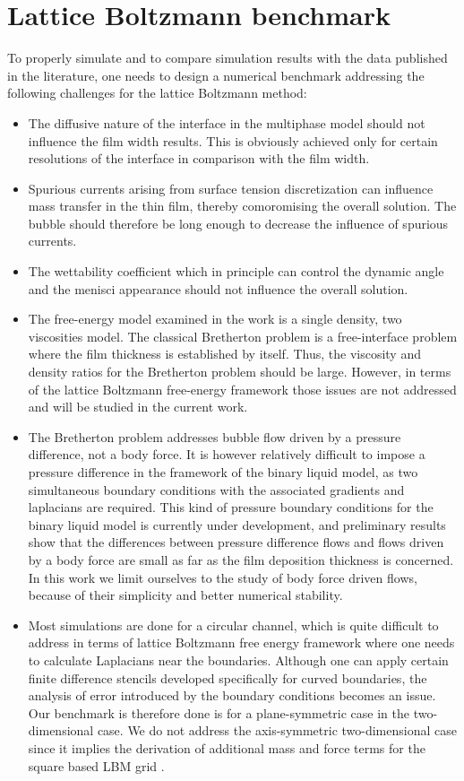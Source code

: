 \documentclass{article}
\begin{document}
\section{Lattice Boltzmann benchmark}
To properly simulate and to compare simulation results with the data
published in the literature, one needs to design a numerical benchmark addressing
the following challenges for the lattice Boltzmann method:
\begin{itemize}
 \item The diffusive nature of the interface in the multiphase model should not
influence the film width results. This is obviously achieved only for certain
resolutions of the interface in comparison with the film width.
 \item Spurious currents arising from surface tension discretization
can influence mass transfer in the thin film, thereby comoromising the
overall solution. The bubble should therefore be long enough to decrease the
influence of spurious currents.
 \item The wettability coefficient which in principle can control the
dynamic angle and the menisci appearance \cite{pagonabarraga-finger} should not
influence the overall solution.
 \item The free-energy model examined in the work is a single density, two
viscosities model. The classical Bretherton problem is a free-interface problem
where the film thickness is established by itself. Thus, the viscosity and density ratios for the
Bretherton problem should
be large. However, in terms of the lattice Boltzmann free-energy framework those issues are not
addressed and will be studied in the current work.
  \item The Bretherton problem addresses bubble flow driven by a pressure
difference, not a body force.  It is however relatively difficult to impose a
pressure difference in the framework of the binary liquid model, as two
simultaneous boundary conditions with the associated gradients and laplacians are required.
This kind of pressure boundary conditions for the binary liquid model is currently
under development, and preliminary results show that the differences between
pressure difference flows and flows driven by a body force are small as far as the film
deposition thickness is concerned.  In this work we limit ourselves to the study
of body force driven flows, because of their simplicity and better numerical stability.
 \item Most simulations are done for a circular channel,
which is quite difficult to address in terms of lattice Boltzmann free energy
framework where one needs to calculate Laplacians near the boundaries.
Although one can apply certain finite difference stencils
\cite{arnold-boundary,hunt-boundary} developed specifically for curved boundaries,
the analysis of error introduced by the boundary conditions becomes an issue.
Our benchmark is therefore done is for a plane-symmetric case in the two-dimensional case. We do
not address the axis-symmetric two-dimensional case since it implies the derivation of additional
mass and force terms for the square based LBM grid \cite{halliday-circular}.
\end{itemize}
\end{document}
